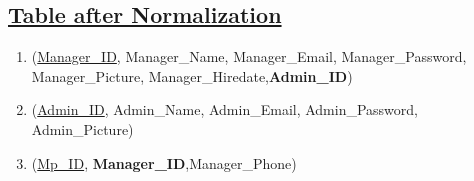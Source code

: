 \subsection*{\underline{Table after Normalization}}
\vskip 0.2in
\begin{enumerate}
    \item  (\underline{Manager\_ID}, Manager\_Name, Manager\_Email, Manager\_Password, Manager\_Picture, Manager\_Hiredate,\textbf{Admin\_ID})
    \item  (\underline{Admin\_ID}, Admin\_Name, Admin\_Email, Admin\_Password, Admin\_Picture)
    \item  (\underline{Mp\_ID}, \textbf{Manager\_ID},{Manager\_Phone})
\end{enumerate}

\clearpage